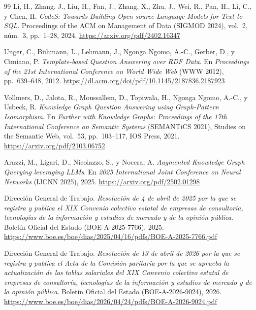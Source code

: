 \documentclass[11pt, a4paper]{report}
\begin{document}
\begin{thebibliography}{99}
		Li, H., Zhang, J., Liu, H., Fan, J., Zhang, X., Zhu, J., Wei, R.,
		Pan, H., Li, C., y Chen, H.
		\textit{CodeS: Towards Building Open-source Language Models for
		Text-to-SQL}. Proceedings of the ACM on Management of Data (SIGMOD
		2024), vol.~2, núm.~3, pp.~1--28, 2024.
		\url{https://arxiv.org/pdf/2402.16347}

		Unger, C., Bühmann, L., Lehmann, J., Ngonga Ngomo, A.-C., Gerber, D.,
		y Cimiano, P.
		\textit{Template-based Question Answering over RDF Data}. En
		\textit{Proceedings of the 21st International Conference on World
		Wide Web} (WWW 2012), pp.~639--648, 2012.
		\url{https://dl.acm.org/doi/pdf/10.1145/2187836.2187923}

		Vollmers, D., Jalota, R., Moussallem, D., Topiwala, H., Ngonga
		Ngomo, A.-C., y Usbeck, R.
		\textit{Knowledge Graph Question Answering using Graph-Pattern
		Isomorphism}. En \textit{Further with Knowledge Graphs: Proceedings of
		the 17th International Conference on Semantic Systems} (SEMANTiCS
		2021), Studies on the Semantic Web, vol.~53, pp.~103--117, IOS Press,
		2021.
		\url{https://arxiv.org/pdf/2103.06752}

		Arazzi, M., Ligari, D., Nicolazzo, S., y Nocera, A.
		\textit{Augmented Knowledge Graph Querying leveraging LLMs}. En
		\textit{2025 International Joint Conference on Neural Networks}
		(IJCNN 2025), 2025.
		\url{https://arxiv.org/pdf/2502.01298}

		Dirección General de Trabajo.
		\textit{Resolución de 4 de abril de 2025 por la que se registra y
		publica el XIX Convenio colectivo estatal de empresas de consultoría,
		tecnologías de la información y estudios de mercado y de la opinión
		pública}. Boletín Oficial del Estado (BOE-A-2025-7766), 2025.
		\url{https://www.boe.es/boe/dias/2025/04/16/pdfs/BOE-A-2025-7766.pdf}

		Dirección General de Trabajo.
		\textit{Resolución de 13 de abril de 2026 por la que se registra y
		publica el Acta de la Comisión paritaria por la que se aprueba la
		actualización de las tablas salariales del XIX Convenio colectivo
		estatal de empresas de consultoría, tecnologías de la información y
		estudios de mercado y de la opinión pública}. Boletín Oficial del
		Estado (BOE-A-2026-9024), 2026.
		\url{https://www.boe.es/boe/dias/2026/04/24/pdfs/BOE-A-2026-9024.pdf}


\end{thebibliography}
\end{document}
